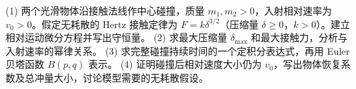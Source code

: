 (1) 两个光滑物体沿接触法线作中心碰撞，质量 \(m_1,m_2>0\)，入射相对速率为 \(v_0>0\)。假定无耗散的 Hertz 接触定律为 \(F=k\delta^{3/2}\)（压缩量 \(\delta\ge0\)，\(k>0\)）。建立相对运动微分方程并写出守恒量。
(2) 求最大压缩量 \(\delta_{\max}\) 和最大接触力，分析与入射速率的幂律关系。
(3) 求完整碰撞持续时间的一个定积分表达式，再用 Euler 贝塔函数 \(B(p,q)\) 表示。
(4) 证明碰撞后相对速度大小仍为 \(v_0\)，写出物体恢复系数及总冲量大小，讨论模型需要的无耗散假设。
